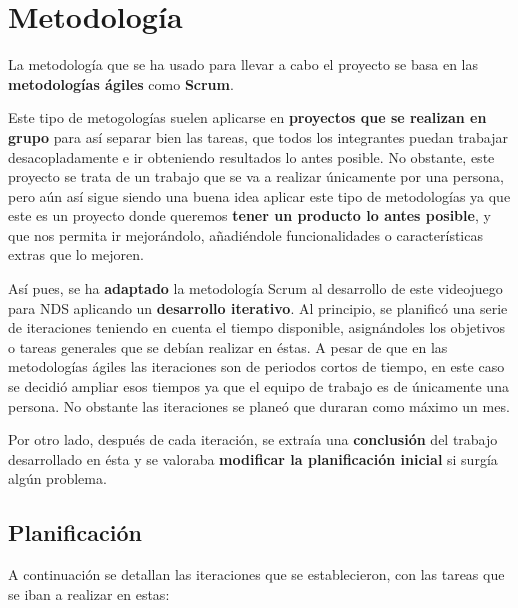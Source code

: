 \chapter{Metodología}

La metodología que se ha usado para llevar a cabo el proyecto se basa en las \textbf{metodologías ágiles} como \textbf{Scrum}.

 \vspace{0.5cm}

Este tipo de metogologías suelen aplicarse en \textbf{proyectos que se realizan en grupo} para así separar bien las tareas, que todos los integrantes puedan trabajar desacopladamente e ir obteniendo resultados lo antes posible. No obstante, este proyecto se trata de un trabajo que se va a realizar únicamente por una persona, pero aún así sigue siendo una buena idea aplicar este tipo de metodologías ya que este es un proyecto donde queremos \textbf{tener un producto lo antes posible}, y que nos permita ir mejorándolo, añadiéndole funcionalidades o características extras que lo mejoren. 

 \vspace{0.5cm}

Así pues, se ha \textbf{adaptado} la metodología Scrum al desarrollo de este videojuego para NDS aplicando un \textbf{desarrollo iterativo}. Al principio, se planificó  una serie de iteraciones teniendo en cuenta el tiempo disponible, asignándoles los objetivos o tareas generales que se debían realizar en éstas. A pesar de que en las metodologías ágiles las iteraciones son de periodos cortos de tiempo, en este caso se decidió ampliar esos tiempos ya que el equipo de trabajo es de únicamente una persona. No obstante las iteraciones se planeó que duraran como máximo un mes.

 \vspace{0.5cm}

Por otro lado, después de cada iteración, se extraía una \textbf{conclusión} del trabajo desarrollado en ésta y se valoraba \textbf{modificar la planificación inicial} si surgía algún problema.

 \vspace{1cm}

\section{Planificación}

A continuación se detallan las iteraciones que se establecieron, con las tareas que se iban a realizar en estas:

